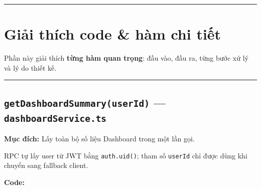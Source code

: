 \documentclass[12pt,a4paper]{article}
\newenvironment{Shaded}{%
  \VerbatimEnvironment
  \begin{quote}\small\ttfamily
}{%
  \end{quote}%
}
\begin{document}
\begin{center}\rule{0.5\linewidth}{0.5pt}\end{center}

\section{Giải thích code \& hàm chi
tiết}\label{giux1ea3i-thuxedch-code-huxe0m-chi-tiux1ebft}

Phần này giải thích \textbf{từng hàm quan trọng}: đầu vào, đầu ra, từng
bước xử lý và lý do thiết kế.

\begin{center}\rule{0.5\linewidth}{0.5pt}\end{center}

\subsection{\texorpdfstring{\texttt{getDashboardSummary(userId)} ---
\texttt{dashboardService.ts}}{getDashboardSummary(userId) --- dashboardService.ts}}\label{getdashboardsummaryuserid-dashboardservice.ts}

\textbf{Mục đích:} Lấy toàn bộ số liệu Dashboard trong một lần gọi.

RPC tự lấy user từ JWT bằng \texttt{auth.uid()}; tham số \texttt{userId}
chỉ được dùng khi chuyển sang fallback client.

\textbf{Code:}

\begin{Shaded}
\begin{Highlighting}[]
   \OperatorTok{:} \NormalTok{)}\OperatorTok{:} \OperatorTok{\textless{}}\OperatorTok{\textgreater{}}\NormalTok{ \{}
  \OperatorTok{,}\OperatorTok{=} \NormalTok{(}\NormalTok{)}\OperatorTok{;}
  \NormalTok{ (}\OperatorTok{!}\OperatorTok{\&\&}
    \OperatorTok{=}\OperatorTok{;}
    \NormalTok{ \{}
      \OperatorTok{,}
\OperatorTok{:} \NormalTok{)}\OperatorTok{,}
\NormalTok{    \}}\OperatorTok{;}
\NormalTok{  \}}
   \OperatorTok{;}
\NormalTok{\}}

\end{Highlighting}
\end{Shaded}
\end{document}
